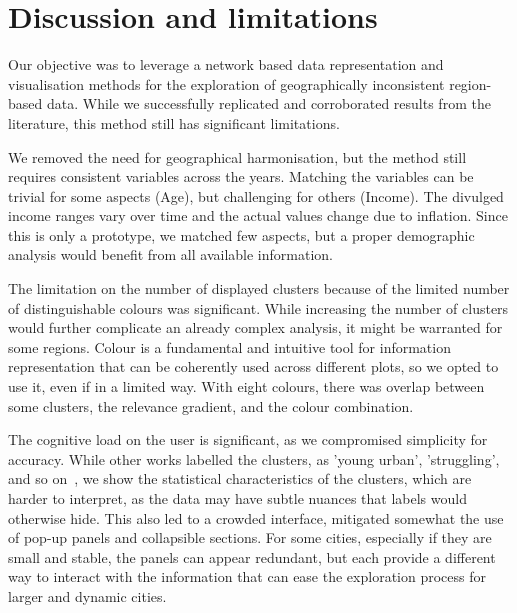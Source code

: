 \section{Discussion and limitations}
\label{sec:discussion}

Our objective was to leverage a network based data representation and
visualisation methods for the exploration of geographically inconsistent
region-based data. While we successfully replicated and corroborated results
from the literature, this method still has significant limitations. 

We removed the need for geographical harmonisation, but the method still
requires consistent variables across the years. Matching the variables can be
trivial for some aspects (Age), but challenging for others (Income). The
divulged income ranges vary over time and the actual values change due to
inflation. Since this is only a prototype, we matched few aspects, but a proper
demographic analysis would benefit from all available information. 

The limitation on the number of displayed clusters because of the limited number
of distinguishable colours was significant. While increasing the number of
clusters would further complicate an already complex analysis, it might be
warranted for some regions. Colour is a fundamental and intuitive tool for
information representation that can be coherently used across different plots,
so we opted to use it, even if in a limited way. With eight colours, there was
overlap between some clusters, the relevance gradient, and the colour
combination. 


The cognitive load on the user is significant, as we compromised simplicity for
accuracy. While other works labelled the clusters, as 'young urban',
'struggling', and so on~\citep{Delmelle2016,Delmelle2017}, we show the
statistical characteristics of the clusters, which are harder to interpret, as
the data may have subtle nuances that labels would otherwise hide. This also led
to a crowded interface, mitigated somewhat the use of pop-up panels and
collapsible sections. For some cities, especially if they are small and stable,
the panels can appear redundant, but each provide a different way to interact
with the information that can ease the exploration process for larger and
dynamic cities.